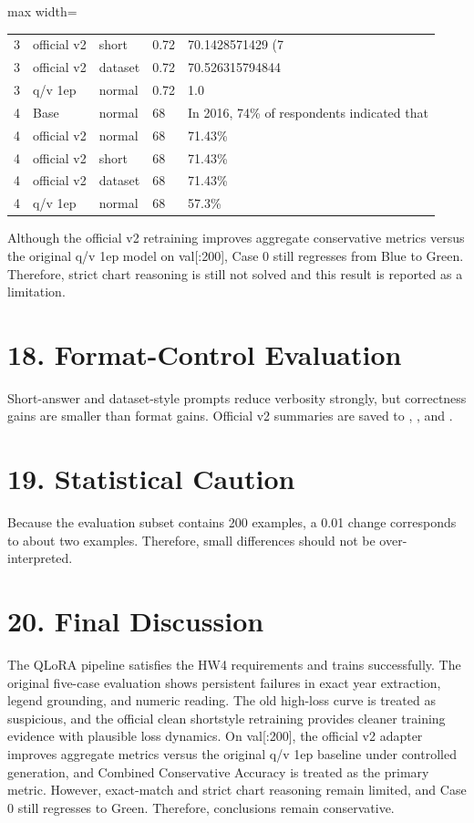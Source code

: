 \documentclass[11pt]{article}
\begin{document}
\begin{center}
\begin{adjustbox}{max width=\textwidth}
\begin{tabular}{llllp{}}
3 & official v2 & short & 0.72 & 70.1428571429 (7 \\
3 & official v2 & dataset & 0.72 & 70.526315794844 \\
3 & q/v 1ep & normal & 0.72 & 1.0 \\
4 & Base & normal & 68 & In 2016, 74\% of respondents indicated that \\
4 & official v2 & normal & 68 & 71.43\% \\
4 & official v2 & short & 68 & 71.43\% \\
4 & official v2 & dataset & 68 & 71.43\% \\
4 & q/v 1ep & normal & 68 & 57.3\% \\
\bottomrule
\end{tabular}
\end{adjustbox}\end{center}
Although the official v2 retraining improves aggregate conservative metrics versus the original q/v 1ep model on val[:200], Case 0 still regresses from Blue to Green. Therefore, strict chart reasoning is still not solved and this result is reported as a limitation.

\section*{18. Format-Control Evaluation}
Short-answer and dataset-style prompts reduce verbosity strongly, but correctness gains are smaller than format gains.
Official v2 summaries are saved to , , and .


\section*{19. Statistical Caution}
Because the evaluation subset contains 200 examples, a 0.01 change corresponds to about two examples. Therefore, small differences should not be over-interpreted.

\section*{20. Final Discussion}
The QLoRA pipeline satisfies the HW4 requirements and trains successfully. The original five-case evaluation shows persistent failures in exact year extraction, legend grounding, and numeric reading. The old high-loss curve is treated as suspicious, and the official clean shortstyle retraining provides cleaner training evidence with plausible loss dynamics. On val[:200], the official v2 adapter improves aggregate metrics versus the original q/v 1ep baseline under controlled generation, and Combined Conservative Accuracy is treated as the primary metric. However, exact-match and strict chart reasoning remain limited, and Case 0 still regresses to Green. Therefore, conclusions remain conservative.
\end{document}
